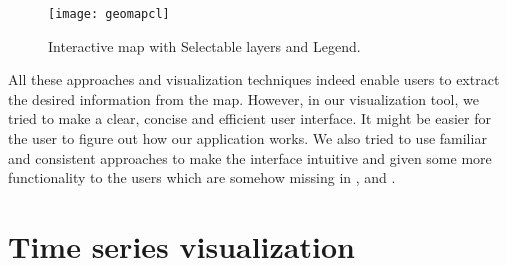 \begin{figure} [H]
  \begin{center}
    \texttt{[image: geomapcl]}
    \caption{Interactive map with Selectable layers and Legend.}
    \label{fig:mapgeo}
  \end{center}
\end{figure}

All these approaches and visualization techniques indeed enable users to extract the desired information from the map. However, in our visualization tool, we tried to make a clear, concise and efficient user interface. It might be easier for the user to figure out how our application works. We also tried to use familiar and consistent approaches to make the interface intuitive and given some more functionality to the users which are somehow missing in \cite{cbg2016}, \cite{wp2015} and \cite{gportal2016}. 

\section{Time series visualization}

